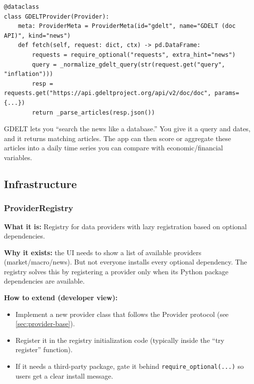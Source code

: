 \documentclass[11pt,a4paper]{article}
\begin{document}
\begin{lstlisting}
@dataclass
class GDELTProvider(Provider):
    meta: ProviderMeta = ProviderMeta(id="gdelt", name="GDELT (doc API)", kind="news")
    def fetch(self, request: dict, ctx) -> pd.DataFrame:
        requests = require_optional("requests", extra_hint="news")
        query = _normalize_gdelt_query(str(request.get("query", "inflation")))
        resp = requests.get("https://api.gdeltproject.org/api/v2/doc/doc", params={...})
        return _parse_articles(resp.json())
\end{lstlisting}

\begin{intuitionbox}
GDELT lets you ``search the news like a database.'' You give it a query and dates, and it returns matching articles. The app can then score or aggregate these articles into a daily time series you can compare with economic/financial variables.
\end{intuitionbox}

\subsection{Infrastructure}

\subsubsection{ProviderRegistry}\label{sec:provider-registry}

\textbf{What it is:} Registry for data providers with lazy registration based on optional dependencies.

\textbf{Why it exists:} the UI needs to show a list of available providers (market/macro/news). But not everyone installs every optional dependency. The registry solves this by registering a provider only when its Python package dependencies are available.

\textbf{How to extend (developer view):}
\begin{itemize}[leftmargin=2em]
  \item Implement a new provider class that follows the Provider protocol (see \ref{sec:provider-base}).
  \item Register it in the registry initialization code (typically inside the ``try register'' function).
  \item If it needs a third-party package, gate it behind \texttt{require\_optional(...)} so users get a clear install message.
\end{itemize}
\end{document}
